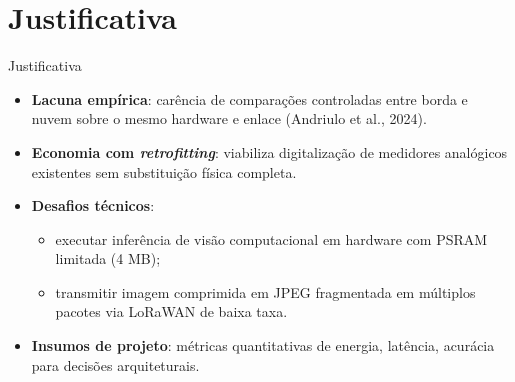 \documentclass[
    aspectratio=169,
    11pt,
    brazil
]{beamer}
\begin{document}
\section{Justificativa}
\begin{frame}{Justificativa}
  \begin{itemize}\footnotesize
    \setlength{\itemsep}{4pt}
    \item \textbf{Lacuna empírica}: carência de comparações controladas entre borda e nuvem sobre o mesmo hardware e enlace (Andriulo et al., 2024).
    \item \textbf{Economia com \textit{retrofitting}}: viabiliza digitalização de medidores analógicos existentes sem substituição física completa.
    \item \textbf{Desafios técnicos}:
      \begin{itemize}\scriptsize
        \item executar inferência de visão computacional em hardware com PSRAM limitada (4 MB);
        \item transmitir imagem comprimida em JPEG fragmentada em múltiplos pacotes via LoRaWAN de baixa taxa.
      \end{itemize}
    \item \textbf{Insumos de projeto}: métricas quantitativas de energia, latência, acurácia para decisões arquiteturais.
  \end{itemize}
\end{frame}

\end{document}
